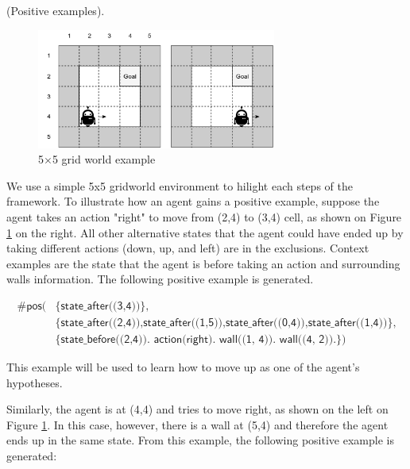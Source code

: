 \begin{examp} \normalfont (Positive examples).

\begin{figure}[!htb]
\centering
\includegraphics[width=0.7\textwidth]{./figures/pipeline_example1}
\caption{5$\times$5 grid world example}
\label{example_pos_example}
\end{figure}

We use a simple 5x5 gridworld environment to hilight each steps of the framework. To illustrate how an agent gains a positive example, suppose the agent takes an action "right" to move from (2,4) to (3,4) cell, as shown on Figure \ref{example_pos_example} on the right.
All other alternative states that the agent could have ended up by taking different actions
(down, up, and left) are in the exclusions.
Context examples are the state that the agent is before taking an action and surrounding walls information. The following positive example is generated.

\begin{equation}
\begin{split}
    \textsf{\#pos(} & \textsf{\{state\_after((3,4))\},}\\
                    & \textsf{\{state\_after((2,4)),state\_after((1,5)),state\_after((0,4)),state\_after((1,4))\},} \\
    & \textsf{\{state\_before((2,4)). action(right). wall((1, 4)). wall((4, 2)).\})}
\end{split}
\end{equation}

This example will be used to learn how to move up as one of the agent's hypotheses.

Similarly, the agent is at (4,4) and tries to move right, as shown on the left on Figure \ref{example_pos_example}. In this case, however, there is a wall at (5,4) and therefore the agent ends up in the same state. From this example, the following positive example is generated:


\end{examp}
